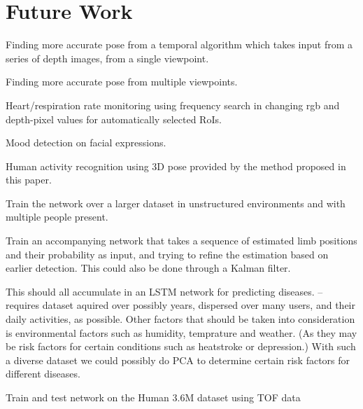 \chapter{Future Work}

Finding more accurate pose from a temporal algorithm which takes input from a series of depth images, from a single viewpoint.

Finding more accurate pose from multiple viewpoints.

Heart/respiration rate monitoring using frequency search in changing rgb and depth-pixel values for automatically selected RoIs.

Mood detection on facial expressions.

Human activity recognition using 3D pose provided by the method proposed in this paper.

Train the network over a larger dataset in unstructured environments and with multiple people present.

Train an accompanying network that takes a sequence of estimated limb positions and their probability as input, and trying to refine the estimation based on earlier detection. This could also be done through a Kalman filter.

This should all accumulate in an LSTM network for predicting diseases. -- requires dataset aquired over possibly years, dispersed over many users, and their daily activities, as possible. Other factors that should be taken into consideration is environmental factors such as humidity, temprature and weather. (As they may be risk factors for certain conditions such as heatstroke or depression.) With such a diverse dataset we could possibly do PCA to determine certain risk factors for different diseases.

Train and test network on the Human 3.6M dataset using TOF data
